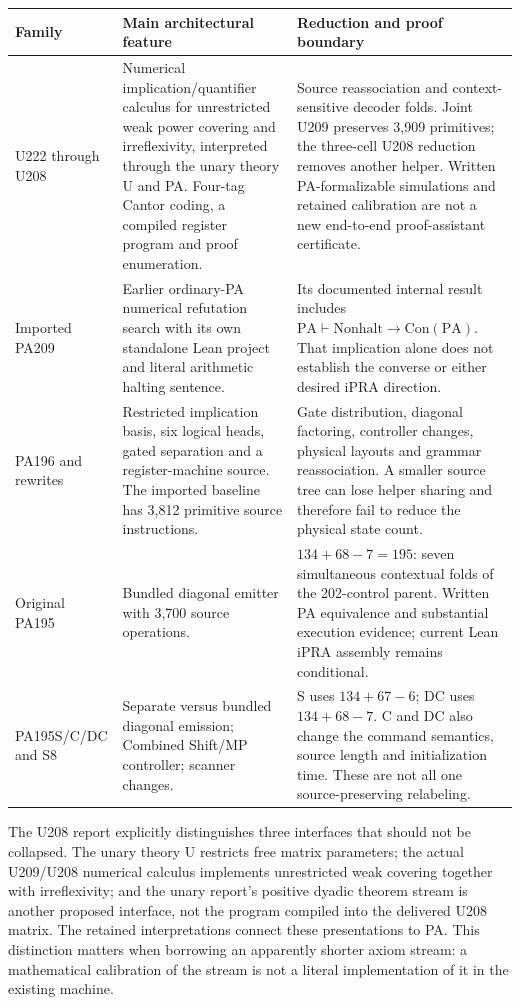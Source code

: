 \begin{longtable}{@{}p{}p{}p{}@{}}
\toprule
Family & Main architectural feature & Reduction and proof boundary\\
\midrule\endhead
U222 through U208 &
Numerical implication/quantifier calculus for unrestricted weak power covering
and irreflexivity, interpreted through the unary theory U and PA. Four-tag
Cantor coding, a compiled register program and proof enumeration. &
Source reassociation and context-sensitive decoder folds. Joint U209 preserves
3,909 primitives; the three-cell U208 reduction removes another helper.
Written PA-formalizable simulations and retained calibration are not a new
end-to-end proof-assistant certificate.\\[5pt]
Imported PA209 &
Earlier ordinary-PA numerical refutation search with its own standalone Lean
project and literal arithmetic halting sentence. &
Its documented internal result includes
$\mathrm{PA}\vdash\mathrm{Nonhalt}\to\mathrm{Con(PA)}$.
That implication alone does not establish the converse or either desired
iPRA direction.\\[5pt]
PA196 and rewrites &
Restricted implication basis, six logical heads, gated separation and a
register-machine source. The imported baseline has 3,812 primitive source
instructions. &
Gate distribution, diagonal factoring, controller changes, physical layouts
and grammar reassociation. A smaller source tree can lose helper sharing and
therefore fail to reduce the physical state count.\\[5pt]
Original PA195 &
Bundled diagonal emitter with 3,700 source operations. &
$134+68-7=195$: seven simultaneous contextual folds of the 202-control parent.
Written PA equivalence and substantial execution evidence; current Lean iPRA
assembly remains conditional.\\[5pt]
PA195S/C/DC and S8 &
Separate versus bundled diagonal emission; Combined Shift/MP controller;
scanner changes. &
S uses $134+67-6$; DC uses $134+68-7$. C and DC also change the command
semantics, source length and initialization time. These are not all one
source-preserving relabeling.\\
\bottomrule
\end{longtable}

The U208 report explicitly distinguishes three interfaces that should not be
collapsed. The unary theory U restricts free matrix parameters; the actual
U209/U208 numerical calculus implements unrestricted weak covering together
with irreflexivity; and the unary report's positive dyadic theorem stream is
another proposed interface, not the program compiled into the delivered U208
matrix. The retained interpretations connect these presentations to PA.
This distinction matters when borrowing an apparently shorter axiom stream:
a mathematical calibration of the stream is not a literal implementation of
it in the existing machine.


